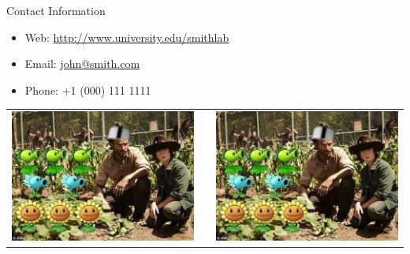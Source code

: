 \documentclass[final]{beamer}
\newlength{\onecolwid}
\begin{document}
\begin{frame}[t]
\begin{columns}[t]
\begin{column}{\onecolwid}
\begin{alertblock}{Contact Information}
\begin{itemize}
\item Web: \href{http://www.university.edu/smithlab}{http://www.university.edu/smithlab}
\item Email: \href{mailto:john@smith.com}{john@smith.com}
\item Phone: +1 (000) 111 1111
\end{itemize}

\end{alertblock}

\begin{center}
\begin{tabular}{ccc}
\includegraphics[width=0.4\linewidth]{logo.png} & \hfill & \includegraphics[width=0.4\linewidth]{logo.png}
\end{tabular}
\end{center}


\end{column} %

\end{columns} %

\end{frame} %
\end{document}
